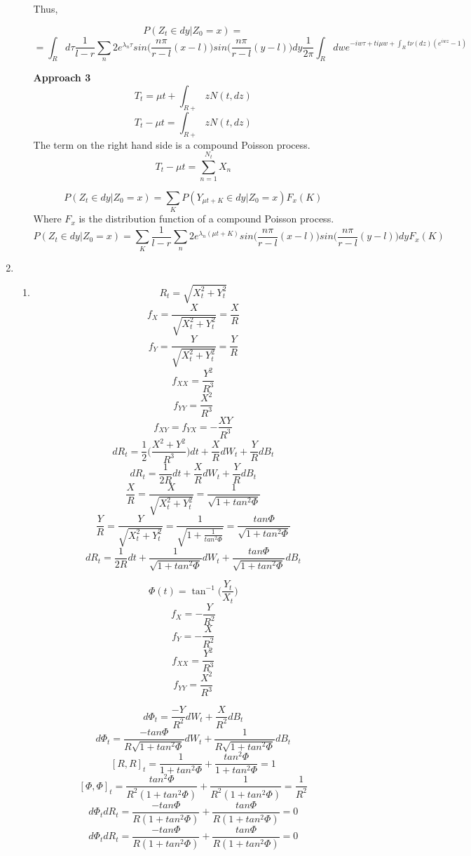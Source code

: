 \documentclass[a4paper,11pt]{article}
\begin{document}
\begin{enumerate}
\begin{enumerate}
 Thus,

  \[P(Z_t \in dy |Z_0 = x) = \]
    \[= \int_R d\tau \frac{1}{l-r} \sum_n 2 e^{\lambda_n\tau}sin\bigg(\frac{n\pi}{r-l}(x-l)\bigg)sin\bigg(\frac{n\pi}{r-l}(y-l)\bigg) dy \frac{1}{2\pi} \int_R dw e^{-iw\tau  + t i\mu w + \int_R t \nu(dz) (e^{iwz}-1)}\]
    
    
{\bf Approach 3}
 \[T_t = \mu t + \int_{R+} z N(t,dz)\]
  \[T_t - \mu t =  \int_{R+} z N(t,dz)\]
    The term on the right hand side is a compound Poisson process.
    \[T_t - \mu t =  \sum_{n=1}^{N_t}X_n\]

 \[P(Z_t \in dy |Z_0 = x) = \sum_K P(Y_{\mu t+ K} \in dy |Z_0 = x) F_x(K)\]
 Where $F_x$ is the distribution function of a compound Poisson process. 
 \[P(Z_t \in dy |Z_0 = x) = \sum_K  \frac{1}{l-r} \sum_n 2 e^{\lambda_n (\mu t +K)}sin\bigg(\frac{n\pi}{r-l}(x-l)\bigg)sin\bigg(\frac{n\pi}{r-l}(y-l)\bigg) dy F_x(K)\]


\end{enumerate}
\item 

\begin{enumerate}

\item
\[R_t = \sqrt{X_t^2 + Y_t^2}\]
\[f_X = \frac{X}{\sqrt{X_t^2 + Y_t^2}}= \frac{X}{R}\]
\[f_Y = \frac{Y}{\sqrt{X_t^2 + Y_t^2}}= \frac{Y}{R}\]
\[f_{XX} = \frac{Y^2}{R^3}\]
\[f_{YY} = \frac{X^2}{R^3}\]
\[f_{XY} = f_{YX} = -\frac{XY}{R^3}\]
\[dR_t = \frac{1}{2}\bigg( \frac{X^2+Y^2}{R^3}\bigg)dt+\frac{X}{R}dW_t+\frac{Y}{R}dB_t\]
\[dR_t = \frac{1}{2R}dt+\frac{X}{R}dW_t+\frac{Y}{R}dB_t\]
\[\frac{X}{R}=\frac{X}{\sqrt{X_t^2 + Y_t^2}}= \frac{1}{\sqrt{1+tan^2\Phi}}\]
\[\frac{Y}{R}=\frac{Y}{\sqrt{X_t^2 + Y_t^2}}= \frac{1}{\sqrt{1+\frac{1}{tan^2\Phi}}}= \frac{tan\Phi}{\sqrt{1+tan^2\Phi}}\]
\[\boxed{dR_t = \frac{1}{2R}dt+\frac{1}{\sqrt{1+tan^2\Phi}}dW_t+\frac{tan\Phi}{\sqrt{1+tan^2\Phi}}dB_t}\]

\[\Phi(t) = \tan^{-1} \big(\frac{Y_t}{X_t}\big)\]
\[f_X =  -\frac{Y}{R^2}\]
\[f_Y = -\frac{X}{R^2}\]
\[f_{XX} = \frac{Y^2}{R^3}\]
\[f_{YY} = \frac{X^2}{R^3}\]

\[d\Phi_t = \frac{-Y}{R^2}dW_t + \frac{X}{R^2}dB_t\]
\[\boxed{d\Phi_t = \frac{-tan\Phi}{R\sqrt{1+tan^2\Phi}}dW_t + \frac{1}{R\sqrt{1+tan^2\Phi}}dB_t}\]
\[[R,R]_t = \frac{1}{1+tan^2\Phi}+ \frac{tan^2\Phi}{1+tan^2\Phi} =  1\]
\[[\Phi,\Phi]_t = \frac{tan^2\Phi}{R^2(1+tan^2\Phi)}+ \frac{1}{R^2(1+tan^2\Phi)} = \frac{1}{R^2} \]
\[d\Phi_t dR_t = \frac{-tan\Phi}{R(1+tan^2\Phi)}+ \frac{tan\Phi}{R(1+tan^2\Phi)} = 0\]
\[d\Phi_t dR_t = \frac{-tan\Phi}{R(1+tan^2\Phi)}+ \frac{tan\Phi}{R(1+tan^2\Phi)} = 0\]


\end{enumerate}
\end{enumerate}
\end{document}
